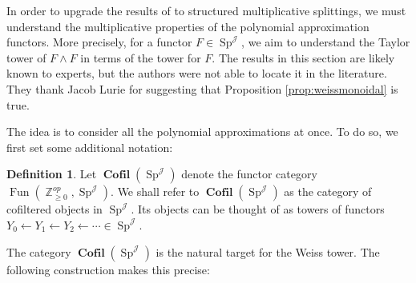 \documentclass[reqno, oneside]{amsart}
\theoremstyle{definition}
\newtheorem{dfn}[nul]{Definition}
\theoremstyle{plain}
\DeclareMathOperator{\Z}{\mathbb{Z}}
\DeclareMathOperator{\Fun}{\text{Fun}}
\DeclareMathOperator{\Sp}{\text{Sp}}
\DeclareMathOperator{\J}{\mathcal{J}}
\DeclareMathOperator{\Cofil}{\textbf{Cofil}}
\begin{document}
In order to upgrade the results of \cite{Arone} to structured multiplicative splittings, we must understand the multiplicative properties of the polynomial approximation functors.  More precisely, for a functor $F\in \Sp^{\J}$, we aim to understand the Taylor tower of $F\wedge F$ in terms of the tower for $F.$  The results in this section are likely known to experts, but the authors were not able to locate it in the literature.  They thank Jacob Lurie for suggesting that Proposition \ref{prop:weissmonoidal} is true.  

The idea is to consider all the polynomial approximations at once.  To do so, we first set some additional notation:

\begin{dfn} 
Let $\Cofil(\Sp^{\J})$ denote the functor category $\Fun(\Z_{\geq 0}^{op}, \Sp^{\J}).$  We shall refer to $\Cofil(\Sp^{\J})$ as the category of cofiltered objects in $\Sp^{\J}$.  Its objects can be thought of as towers of functors $Y_0\leftarrow Y_1\leftarrow Y_2 \leftarrow \cdots \in \Sp^{\J}$.
\end{dfn}%

The category $\Cofil(\Sp^{\J})$ is the natural target for the Weiss tower.  The following construction makes this precise:
\end{document}
